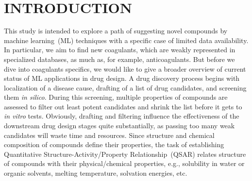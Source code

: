 \documentclass[12pt]{article}
\begin{document}
  \makeatletter
  \renewcommand\@biblabel[1]{#1.}
  \makeatother



\renewcommand{\baselinestretch}{1.5}
\normalsize

\clearpage

\section*{\sffamily \Large INTRODUCTION}\label{sec:Intro}


This study is intended to explore a path of suggesting novel compounds by machine learning~(ML) techniques with a specific case of limited data availability.
In particular, we aim to find new coagulants, which are weakly represented in specialized databases, as much as, for example, anticoagulants.
But before we dive into coagulants specifics, we would like to give a broader overview of current status of ML applications in drug design.
A drug discovery process begins with localization of a disease cause, drafting of a list of drug candidates, and screening them \textit{in silico}.
During this screening, multiple properties of compounds are assessed to filter out least potent candidates and shrink the list before it gets to \textit{in vitro} tests.
Obviously, drafting and filtering influence the effectiveness of the downstream drug design stages quite substantially, as passing too many weak candidates will waste time and resources.
Since structure and chemical composition of compounds define their properties, the task of establishing Quantitative Structure-Activity/Property Relationship~(QSAR) relates structure of compounds with their physical/chemical properties, e.g., solubility in water or organic solvents, melting temperature, solvation energies, etc.~\cite{Lusci2013,Pyzer-Knapp2015,Schneider2018}
\end{document}
